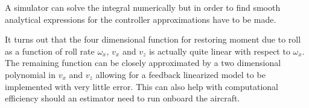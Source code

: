 A simulator can solve the integral numerically but in order to find smooth analytical expressions for the controller approximations have to be made.

It turns out that the four dimensional function for restoring moment due to roll as a function of roll rate $\omega_x$, $v_x$ and $v_z$ is actually quite linear with respect to $\omega_x$.
The remaining function can be closely approximated by a two dimensional polynomial in $v_x$ and $v_z$ allowing for a feedback linearized model to be implemented with very little error.
This can also help with computational efficiency should an estimator need to run onboard the aircraft.